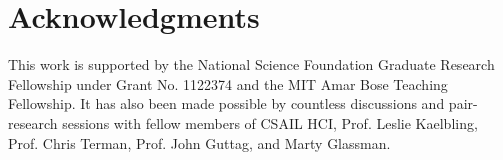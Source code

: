 \documentclass[12pt]{article}
\newcommand\codevar[1]{\texttt{#1}}
\begin{document}
\section{Acknowledgments}
This work is supported by the National Science Foundation Graduate Research Fellowship under Grant No. 1122374 and the MIT Amar Bose Teaching Fellowship. It has also been made possible by countless discussions and pair-research sessions with fellow members of CSAIL HCI, Prof. Leslie Kaelbling, Prof. Chris Terman, Prof. John Guttag, and Marty Glassman.

\end{document}
